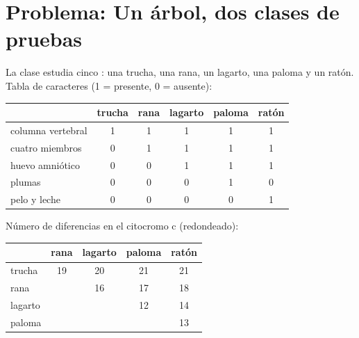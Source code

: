 \section{Problema: Un árbol, dos clases de pruebas}

\begin{problem}
\label{pb:g10:common-ancestry:1}
La clase estudia cinco : una trucha, una rana, un lagarto, una
paloma y un ratón. Tabla de caracteres (1 = presente, 0 = ausente):

\begin{center}
\begin{tabular}{lccccc}
 & trucha & rana & lagarto & paloma & ratón \\ \hline
columna vertebral & 1 & 1 & 1 & 1 & 1 \\
cuatro miembros & 0 & 1 & 1 & 1 & 1 \\
huevo amniótico & 0 & 0 & 1 & 1 & 1 \\
plumas & 0 & 0 & 0 & 1 & 0 \\
pelo y leche & 0 & 0 & 0 & 0 & 1 \\
\end{tabular}
\end{center}

Número de diferencias en el citocromo c (redondeado):

\begin{center}
\begin{tabular}{lcccc}
 & rana & lagarto & paloma & ratón \\ \hline
trucha & 19 & 20 & 21 & 21 \\
rana & & 16 & 17 & 18 \\
lagarto & & & 12 & 14 \\
paloma & & & & 13 \\
\end{tabular}
\end{center}


\end{problem}
